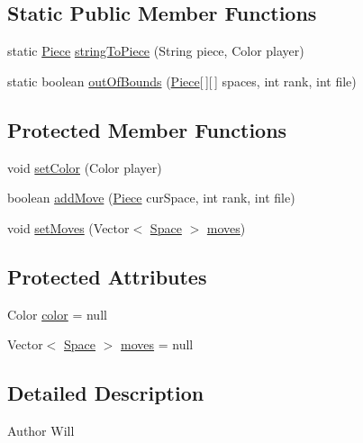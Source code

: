 \subsection*{Static Public Member Functions}
\begin{DoxyCompactItemize}
\item 
static \hyperlink{classpieces_1_1_piece}{Piece} \hyperlink{classpieces_1_1_piece_ae4d129f2285197d6c75dbd21005ce412}{string\-To\-Piece} (String piece, Color player)
\item 
static boolean \hyperlink{classpieces_1_1_piece_a3bb514a9da872d7c44165835fa3ce4b0}{out\-Of\-Bounds} (\hyperlink{classpieces_1_1_piece}{Piece}\mbox{[}$\,$\mbox{]}\mbox{[}$\,$\mbox{]} spaces, int rank, int file)
\end{DoxyCompactItemize}
\subsection*{Protected Member Functions}
\begin{DoxyCompactItemize}
\item 
void \hyperlink{classpieces_1_1_piece_a87ecc007e69c3d6ed89a5ed34c16ebaf}{set\-Color} (Color player)
\item 
boolean \hyperlink{classpieces_1_1_piece_a92b7dd91bd1d1f79d10203123d77c071}{add\-Move} (\hyperlink{classpieces_1_1_piece}{Piece} cur\-Space, int rank, int file)
\item 
void \hyperlink{classpieces_1_1_piece_a23b77741794ea328c50796e3dcd5e360}{set\-Moves} (Vector$<$ \hyperlink{classmodel_1_1_space}{Space} $>$ \hyperlink{classpieces_1_1_piece_a64fbd75313e761ca2f13e3e542a06ec7}{moves})
\end{DoxyCompactItemize}
\subsection*{Protected Attributes}
\begin{DoxyCompactItemize}
\item 
Color \hyperlink{classpieces_1_1_piece_aad2c2ef830902ae3d7da9709976216d6}{color} = null
\item 
Vector$<$ \hyperlink{classmodel_1_1_space}{Space} $>$ \hyperlink{classpieces_1_1_piece_a64fbd75313e761ca2f13e3e542a06ec7}{moves} = null
\end{DoxyCompactItemize}


\subsection{Detailed Description}
\begin{DoxyAuthor}{Author}
Will 
\end{DoxyAuthor}


